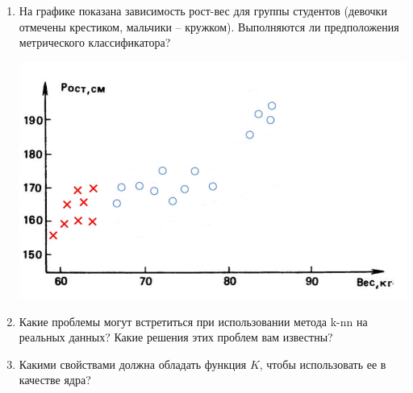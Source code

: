 \documentclass[12pt] {article}
\begin{document}
\begin{enumerate}
\vspace{10mm}
\item 
\begin{minipage}[t]{0.55\linewidth}
      На графике показана зависимость рост-вес для группы студентов (девочки отмечены крестиком, мальчики -- кружком). Выполняются ли предположения метрического классификатора?
   \end{minipage}%
   \hfill
   \begin{minipage}[t]{0.40\linewidth}
     \vspace{-5.5ex}
	\includegraphics[width=\textwidth]{images/students1}
   \end{minipage}

\vspace{10mm}
\item Какие проблемы могут встретиться при использовании метода k-nn на реальных данных? Какие решения этих проблем вам известны?

\vspace{10mm}
\item Какими свойствами должна обладать функция $K$, чтобы использовать ее в качестве ядра?

\end{enumerate}
\end{document}
